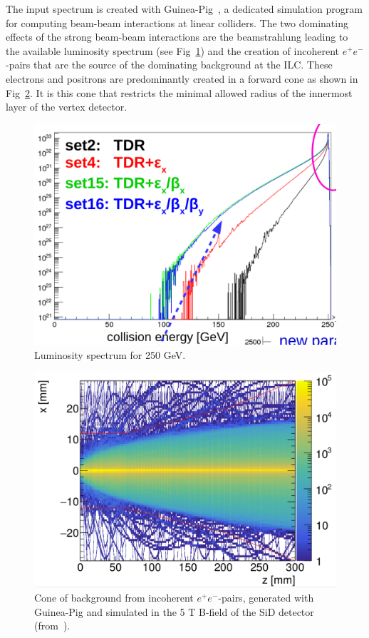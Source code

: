 The input spectrum is created with Guinea-Pig~\cite{Schulte:1998au}, a dedicated simulation program for computing
beam-beam interactions at linear colliders. The two dominating effects of the strong beam-beam interactions are the 
beamstrahlung leading to the available luminosity spectrum (see Fig~\ref{fig:lumi_spectrum}) and the creation of
incoherent $e^+e^-$-pairs that are the source of the dominating background at the ILC. These electrons and positrons
are predominantly created in a forward cone as shown in Fig~\ref{fig:pair_bg}. It is this cone that restricts the minimal
allowed radius of the innermost layer of the vertex detector.

\begin{figure}
\begin{center}
\includegraphics[width=0.80\hsize]{chapters/figures/lumi_spectrum_placeholder.png}
\end{center}
\caption{Luminosity spectrum for 250 GeV.}
\label{fig:lumi_spectrum}
\end{figure}

\begin{figure}
\begin{center}
\includegraphics[width=0.90\hsize]{chapters/figures/pair_bg_cone_SiD.png}
\end{center}
\caption{Cone of background from incoherent $e^+e^-$-pairs, generated with Guinea-Pig and simulated in the 5 T B-field of the SiD
  detector (from~\cite{Schutz:2017ihd}).}
\label{fig:pair_bg}
\end{figure}

